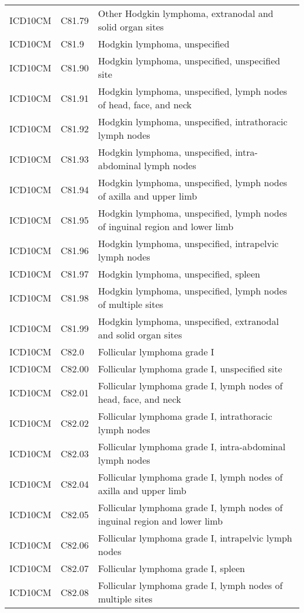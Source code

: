\begin{longtable}{p{}p{}p{}}
  ICD10CM & C81.79 & Other Hodgkin lymphoma, extranodal and solid organ sites \\ 
  ICD10CM & C81.9 & Hodgkin lymphoma, unspecified \\ 
  ICD10CM & C81.90 & Hodgkin lymphoma, unspecified, unspecified site \\ 
  ICD10CM & C81.91 & Hodgkin lymphoma, unspecified, lymph nodes of head, face, and neck \\ 
  ICD10CM & C81.92 & Hodgkin lymphoma, unspecified, intrathoracic lymph nodes \\ 
  ICD10CM & C81.93 & Hodgkin lymphoma, unspecified, intra-abdominal lymph nodes \\ 
  ICD10CM & C81.94 & Hodgkin lymphoma, unspecified, lymph nodes of axilla and upper limb \\ 
  ICD10CM & C81.95 & Hodgkin lymphoma, unspecified, lymph nodes of inguinal region and lower limb \\ 
  ICD10CM & C81.96 & Hodgkin lymphoma, unspecified, intrapelvic lymph nodes \\ 
  ICD10CM & C81.97 & Hodgkin lymphoma, unspecified, spleen \\ 
  ICD10CM & C81.98 & Hodgkin lymphoma, unspecified, lymph nodes of multiple sites \\ 
  ICD10CM & C81.99 & Hodgkin lymphoma, unspecified, extranodal and solid organ sites \\ 
  ICD10CM & C82.0 & Follicular lymphoma grade I \\ 
  ICD10CM & C82.00 & Follicular lymphoma grade I, unspecified site \\ 
  ICD10CM & C82.01 & Follicular lymphoma grade I, lymph nodes of head, face, and neck \\ 
  ICD10CM & C82.02 & Follicular lymphoma grade I, intrathoracic lymph nodes \\ 
  ICD10CM & C82.03 & Follicular lymphoma grade I, intra-abdominal lymph nodes \\ 
  ICD10CM & C82.04 & Follicular lymphoma grade I, lymph nodes of axilla and upper limb \\ 
  ICD10CM & C82.05 & Follicular lymphoma grade I, lymph nodes of inguinal region and lower limb \\ 
  ICD10CM & C82.06 & Follicular lymphoma grade I, intrapelvic lymph nodes \\ 
  ICD10CM & C82.07 & Follicular lymphoma grade I, spleen \\ 
  ICD10CM & C82.08 & Follicular lymphoma grade I, lymph nodes of multiple sites \\ 

\end{longtable}

